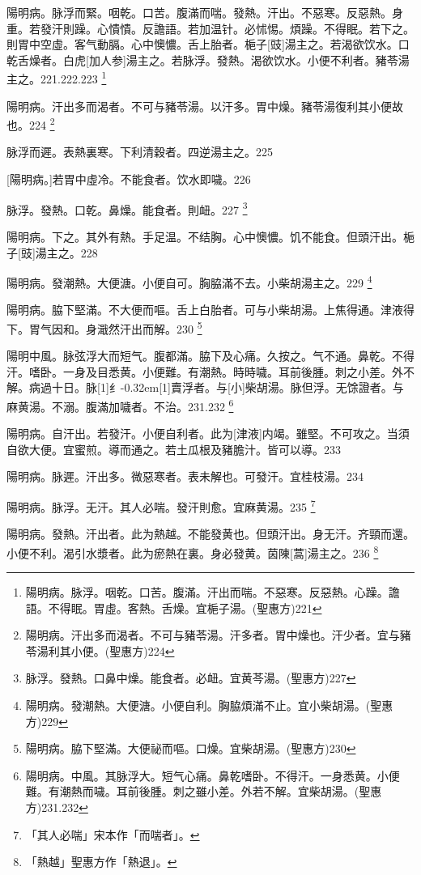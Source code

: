 \documentclass[oneside,b4paper]{ctexbook}
\begin{document}
\begin{flushleft}
陽明病。脉浮而緊。咽乾。口苦。腹滿而喘。發熱。汗出。不惡寒。反惡熱。身重。若發汗則躁。心憒憒。反譫語。若加温针。必怵惕。煩躁。不得眠。若下之。則胃中空虛。客气動膈。心中懊憹。舌上胎者。梔子[豉]湯主之。若渴欲饮水。口乾舌燥者。白虎[加人参]湯主之。若脉浮。發熱。渴欲饮水。小便不利者。豬苓湯主之。221.222.223
\footnote{陽明病。脉浮。咽乾。口苦。腹滿。汗出而喘。不惡寒。反惡熱。心躁。譫語。不得眠。胃虛。客熱。舌燥。宜梔子湯。(聖惠方)221}

陽明病。汗出多而渴者。不可与豬苓湯。以汗多。胃中燥。豬苓湯復利其小便故也。224
\footnote{陽明病。汗出多而渴者。不可与豬苓湯。汗多者。胃中燥也。汗少者。宜与豬苓湯利其小便。(聖惠方)224}

脉浮而遲。表熱裏寒。下利清穀者。四逆湯主之。225

[陽明病。]若胃中虛冷。不能食者。饮水即噦。226

脉浮。發熱。口乾。鼻燥。能食者。則衄。227
\footnote{脉浮。發熱。口鼻中燥。能食者。必衄。宜黄芩湯。(聖惠方)227}

陽明病。下之。其外有熱。手足温。不结胸。心中懊憹。饥不能食。但頭汗出。梔子[豉]湯主之。228

陽明病。發潮熱。大便溏。小便自可。胸脇滿不去。小柴胡湯主之。229
\footnote{陽明病。發潮熱。大便溏。小便自利。胸脇煩滿不止。宜小柴胡湯。(聖惠方)229}

陽明病。脇下堅滿。不大便而嘔。舌上白胎者。可与小柴胡湯。上焦得通。津液得下。胃气因和。身濈然汗出而解。230
\footnote{陽明病。脇下堅滿。大便祕而嘔。口燥。宜柴胡湯。(聖惠方)230}

陽明中風。脉弦浮大而短气。腹都滿。脇下及心痛。久按之。气不通。鼻乾。不得汗。嗜卧。一身及目悉黄。小便難。有潮熱。時時噦。耳前後腫。刺之小差。外不解。病過十日。脉{\hbox{\scalebox{0.6}[1]{纟}\kern-0.32em\scalebox{0.7}[1]{賣}}}浮者。与[小]柴胡湯。脉但浮。无馀證者。与麻黄湯。不溺。腹滿加噦者。不治。231.232
\footnote{陽明病。中風。其脉浮大。短气心痛。鼻乾嗜卧。不得汗。一身悉黄。小便難。有潮熱而噦。耳前後腫。刺之雖小差。外若不解。宜柴胡湯。(聖惠方)231.232}

陽明病。自汗出。若發汗。小便自利者。此为[津液]内竭。雖堅。不可攻之。当須自欲大便。宜蜜煎。導而通之。若土瓜根及豬膽汁。皆可以導。233

陽明病。脉遲。汗出多。微惡寒者。表未解也。可發汗。宜桂枝湯。234

陽明病。脉浮。无汗。其人必喘。發汗則愈。宜麻黄湯。235
\footnote{「其人必喘」宋本作「而喘者」。}

陽明病。發熱。汗出者。此为熱越。不能發黄也。但頭汗出。身无汗。齐頸而還。小便不利。渴引水漿者。此为瘀熱在裏。身必發黄。茵陳[蒿]湯主之。236
\footnote{「熱越」聖惠方作「熱退」。}


\end{flushleft}
\end{document}
